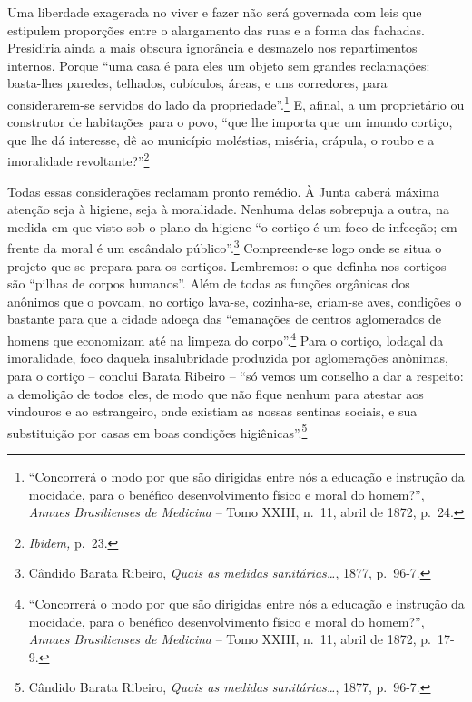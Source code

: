 Uma liberdade exagerada no viver e fazer não será governada com leis que
estipulem proporções entre o alargamento das ruas e a forma das
fachadas. Presidiria ainda a mais obscura ignorância e desmazelo nos
repartimentos internos. Porque ``uma casa é para eles um objeto sem
grandes reclamações: basta-lhes paredes, telhados, cubículos, áreas, e
uns corredores, para considerarem-se servidos do lado da
propriedade''.\footnote{``Concorrerá o modo por que são dirigidas entre
  nós a educação e instrução da mocidade, para o benéfico
  desenvolvimento físico e moral do homem?'', \emph{Annaes Brasilienses
  de Medicina} -- Tomo XXIII, n.~11, abril de 1872, p.~24.} E, afinal, a
um proprietário ou construtor de habitações para o povo, ``que lhe
importa que um imundo cortiço, que lhe dá interesse, dê ao município
moléstias, miséria, crápula, o roubo e a imoralidade
revoltante?''\footnote{\emph{Ibidem,} p.~23.}

Todas essas considerações reclamam pronto remédio. À Junta caberá máxima
atenção seja à higiene, seja à moralidade. Nenhuma delas sobrepuja a
outra, na medida em que visto sob o plano da higiene ``o cortiço é um
foco de infecção; em frente da moral é um escândalo público''.\footnote{Cândido
  Barata Ribeiro, \emph{Quais as medidas sanitárias\ldots{}}, 1877,
  p.~96-7.} Compreende-se logo onde se situa o projeto que se prepara
para os cortiços. Lembremos: o que definha nos cortiços são ``pilhas de
corpos humanos''. Além de todas as funções orgânicas dos anônimos que o
povoam, no cortiço lava-se, cozinha-se, criam-se aves, condições o
bastante para que a cidade adoeça das ``emanações de centros aglomerados
de homens que economizam até na limpeza do corpo''.\footnote{``Concorrerá
  o modo por que são dirigidas entre nós a educação e instrução da
  mocidade, para o benéfico desenvolvimento físico e moral do homem?'',
  \emph{Annaes Brasilienses de Medicina} -- Tomo XXIII, n.~11, abril de
  1872, p.~17-9.} Para o cortiço, lodaçal da imoralidade, foco daquela
insalubridade produzida por aglomerações anônimas, para o cortiço --
conclui Barata Ribeiro -- ``só vemos um conselho a dar a respeito: a
demolição de todos eles, de modo que não fique nenhum para atestar aos
vindouros e ao estrangeiro, onde existiam as nossas sentinas sociais, e
sua substituição por casas em boas condições higiênicas''.\footnote{Cândido
  Barata Ribeiro, \emph{Quais as medidas sanitárias\ldots{}}, 1877,
  p.~96-7.}

